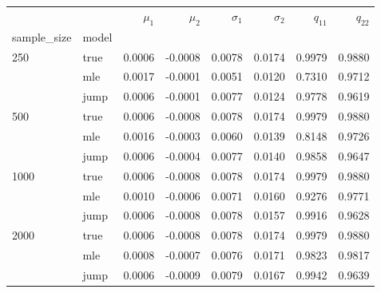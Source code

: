 \begin{tabular}{llrrrrrr}
\toprule
     &      &  $\mu_1$ &  $\mu_2$ &  $\sigma_1$ &  $\sigma_2$ &  $q_11$ &  $q_22$ \\
sample_size & model &          &          &             &             &         &         \\
\midrule
250  & true &   0.0006 &  -0.0008 &      0.0078 &      0.0174 &  0.9979 &  0.9880 \\
     & mle &   0.0017 &  -0.0001 &      0.0051 &      0.0120 &  0.7310 &  0.9712 \\
     & jump &   0.0006 &  -0.0001 &      0.0077 &      0.0124 &  0.9778 &  0.9619 \\
500  & true &   0.0006 &  -0.0008 &      0.0078 &      0.0174 &  0.9979 &  0.9880 \\
     & mle &   0.0016 &  -0.0003 &      0.0060 &      0.0139 &  0.8148 &  0.9726 \\
     & jump &   0.0006 &  -0.0004 &      0.0077 &      0.0140 &  0.9858 &  0.9647 \\
1000 & true &   0.0006 &  -0.0008 &      0.0078 &      0.0174 &  0.9979 &  0.9880 \\
     & mle &   0.0010 &  -0.0006 &      0.0071 &      0.0160 &  0.9276 &  0.9771 \\
     & jump &   0.0006 &  -0.0008 &      0.0078 &      0.0157 &  0.9916 &  0.9628 \\
2000 & true &   0.0006 &  -0.0008 &      0.0078 &      0.0174 &  0.9979 &  0.9880 \\
     & mle &   0.0008 &  -0.0007 &      0.0076 &      0.0171 &  0.9823 &  0.9817 \\
     & jump &   0.0006 &  -0.0009 &      0.0079 &      0.0167 &  0.9942 &  0.9639 \\
\bottomrule
\end{tabular}
